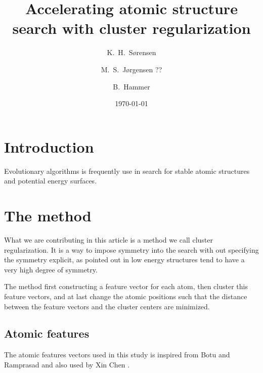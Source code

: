 \documentclass[%
 aps,
 prl,%
 amsmath,amssymb,
 reprint,%
]{revtex4-1}
\begin{document}
\title[]{Accelerating atomic structure search with cluster regularization}%

\author{K.\ H.\ S{\o}rensen}
\author{M.\ S.\ J{\o}rgensen ??}
\author{B.\ Hammer}
 
\date{\today}%

\begin{abstract}
\end{abstract}

\keywords{}%
\maketitle

\section{\label{sec:introduction}Introduction}
Evolutionary algorithms is frequently use in search for stable atomic structures and potential energy surfaces.

\section{The method}
What we are contributing in this article is a method we call cluster regularization. 
It is a way to impose symmetry into the search with out specifying the symmetry explicit, 
as pointed out in \cite{Pikard2011} low energy structures tend to have a very high degree of symmetry.

The method first constructing a feature vector for each atom, then cluster this feature vectors, and at last change the atomic positions such that the distance between the feature vectors and the cluster centers are minimized.   


\subsection{Atomic features}
 
The atomic features vectors used in this study is inspired from Botu and Ramprasad \cite{Boto2015} and also used by Xin Chen \cite{Chen2017}.
\end{document}
